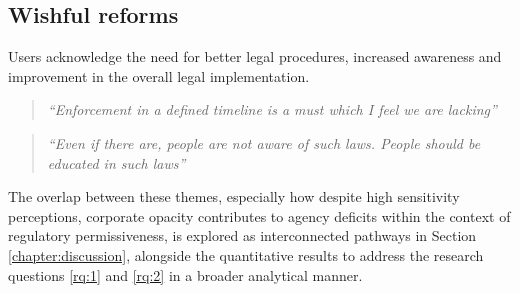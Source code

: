 \subsection{Wishful reforms} \label{T4.3:futurehopes}
Users acknowledge the need for better legal procedures, increased awareness and improvement in the overall legal implementation.
        \begin{quote}
            \textit{``Enforcement in a defined timeline is a must which I feel we are lacking''}
        \end{quote}
        \begin{quote}
            \textit{``Even if there are, people are not aware of such laws. People should be educated in such laws''}
        \end{quote}


The overlap between these themes, especially how despite high sensitivity perceptions, corporate opacity contributes to agency deficits within the context of regulatory permissiveness, is explored as interconnected pathways in Section \ref{chapter:discussion}, alongside the quantitative results to address the research questions \ref{rq:1} and \ref{rq:2} in a broader analytical manner. 

